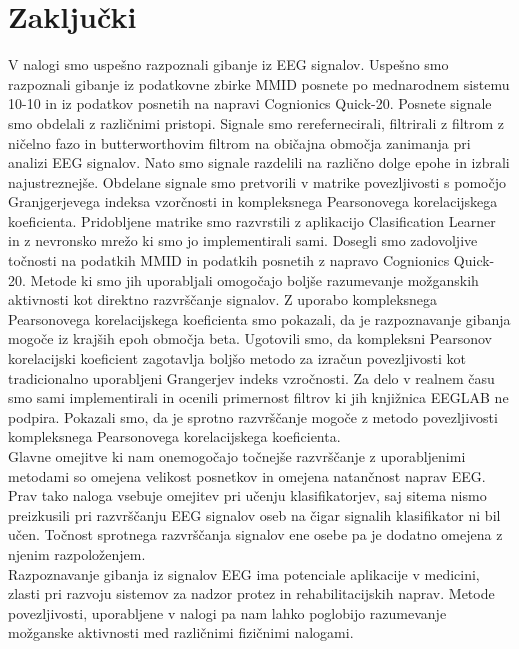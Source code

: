 \chapter{Zaključki}
V nalogi smo uspešno razpoznali gibanje iz EEG signalov. Uspešno smo razpoznali gibanje iz podatkovne zbirke MMID posnete po mednarodnem sistemu 10-10 in iz podatkov posnetih na napravi Cognionics Quick-20. Posnete signale smo obdelali z različnimi pristopi. Signale smo rerefernecirali, filtrirali z filtrom z ničelno fazo in butterworthovim filtrom na običajna območja zanimanja pri analizi EEG signalov. Nato smo signale razdelili na različno dolge epohe in izbrali najustreznejše. Obdelane signale smo pretvorili v matrike povezljivosti s pomočjo Granjgerjevega indeksa vzorčnosti in kompleksnega Pearsonovega korelacijskega koeficienta. Pridobljene matrike smo razvrstili z aplikacijo Clasification Learner in z nevronsko mrežo ki smo jo implementirali sami. Dosegli smo zadovoljive točnosti na podatkih MMID in podatkih posnetih z napravo Cognionics Quick-20. Metode ki smo jih uporabljali omogočajo boljše razumevanje možganskih aktivnosti kot direktno razvrščanje signalov. Z uporabo kompleksnega Pearsonovega korelacijskega koeficienta smo pokazali, da je razpoznavanje gibanja mogoče iz krajših epoh območja beta. Ugotovili smo, da kompleksni Pearsonov korelacijski koeficient zagotavlja boljšo metodo za izračun povezljivosti kot tradicionalno uporabljeni Grangerjev indeks vzročnosti. Za delo v realnem času smo sami implementirali in ocenili primernost filtrov ki jih knjižnica EEGLAB ne podpira. Pokazali smo, da je sprotno razvrščanje mogoče z metodo povezljivosti kompleksnega Pearsonovega korelacijskega koeficienta.\\
Glavne omejitve ki nam onemogočajo točnejše razvrščanje z uporabljenimi metodami so omejena velikost posnetkov in omejena natančnost naprav EEG. Prav tako naloga vsebuje omejitev pri učenju klasifikatorjev, saj sitema nismo preizkusili pri razvrščanju EEG signalov oseb na čigar signalih klasifikator ni bil učen. Točnost sprotnega razvrščanja signalov ene osebe pa je dodatno omejena z njenim razpoloženjem.\\
Razpoznavanje gibanja iz signalov EEG ima potenciale aplikacije v medicini, zlasti pri razvoju sistemov za nadzor protez in rehabilitacijskih naprav. Metode povezljivosti, uporabljene v nalogi pa nam lahko poglobijo razumevanje možganske aktivnosti med različnimi fizičnimi nalogami.